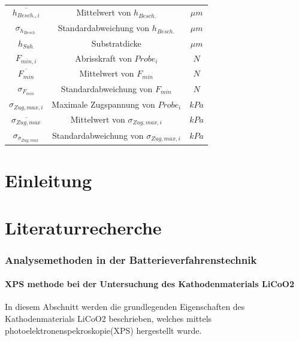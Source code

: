 \documentclass[12pt,UTF8]{article}
\begin{document}
\begin{table}[H]
\begin{tabular}{ccc}
        $\overline{h_{Besch.,i}}$     & Mittelwert von $h_{Besch.}$                 & $\mu m$      \\
        $\sigma_{h_{Besch.}}$         & Standardabweichung von $h_{Besch.}$         & $\mu m$      \\
        $h_{Sub.}$                    & Substratdicke                               & $\mu m$      \\
        $F_{min,i}$                   & Abrisskraft von $Probe_i$                   & $N$          \\
        $\overline{F_{min}}$          & Mittelwert von $F_{min}$                    & $N$          \\
        $\sigma_{F_{min}}$            & Standardabweichung von $F_{min}$            & $N$          \\
        $\sigma_{Zug,max,i}$          & Maximale Zugspannung von $Probe_i$          & $kPa$        \\
        $\overline{\sigma_{Zug,max}}$ & Mittelwert von $\sigma_{Zug,max,i}$         & $kPa$        \\
        $\sigma_{\sigma_{Zug,max}}$   & Standardabweichung von $\sigma_{Zug,max,i}$ & $kPa$        \\
        \midrule
    \end{tabular}

\end{table}

\newpage

\part{Einleitung}

\newpage

\part{Literaturrecherche}
\section{Analysemethoden in der
  Batterieverfahrenstechnik}

\subsection{XPS methode bei der Untersuchung des Kathodenmaterials LiCoO2}
In diesem Abschnitt werden die grundlegenden Eigenschaften des Kathodenmaterials
LiCoO2 beschrieben, welches mittels photoelektronenspekroskopie(XPS) hergestellt wurde.
\end{document}
